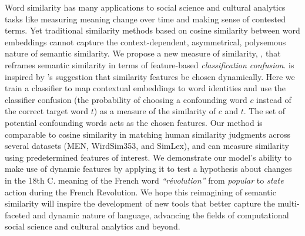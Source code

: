 Word similarity has many applications to social science and cultural analytics tasks like measuring meaning change over time and making sense of contested terms. 
Yet traditional similarity methods based on cosine similarity between word embeddings 
cannot capture the context-dependent, asymmetrical, polysemous nature of semantic similarity.
We propose a new measure of similarity,  \wc,
that reframes semantic similarity in terms of feature-based \textit{classification confusion}.
\wc is inspired by \citet{tversky1977features}'s suggestion
that similarity features be chosen dynamically.
Here we train a classifier to map contextual embeddings to word identities and use the classifier confusion (the probability of choosing a confounding word $c$ instead of the correct target word $t$) as a measure of the similarity of $c$ and $t$. The set of potential confounding words acts as the chosen features. Our method is comparable to cosine similarity in matching human similarity judgments across several datasets
(MEN, WirdSim353, and SimLex), and can measure similarity using predetermined features of interest.
We demonstrate our model's ability to make use of dynamic features by applying it to test a hypothesis about changes in the 18th C. meaning of the French word \textit{``révolution''} from {\em popular} to {\em state} action during the French Revolution. 
We hope this reimagining of semantic similarity will inspire the development of new tools that better capture the multi-faceted and dynamic nature of language, advancing the fields of computational social science and cultural analytics and beyond.